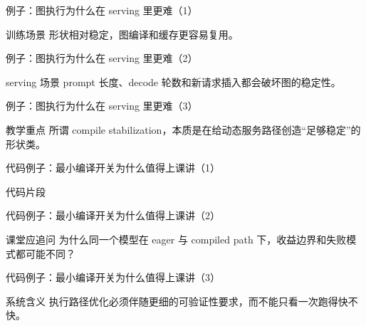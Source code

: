 \begin{frame}{例子：图执行为什么在 serving 里更难（1）}
\begin{block}{训练场景}
    形状相对稳定，图编译和缓存更容易复用。
  \end{block}
\end{frame}

\begin{frame}{例子：图执行为什么在 serving 里更难（2）}
\begin{block}{serving 场景}
    prompt 长度、decode 轮数和新请求插入都会破坏图的稳定性。
  \end{block}
\end{frame}

\begin{frame}{例子：图执行为什么在 serving 里更难（3）}
\begin{block}{教学重点}
    所谓 compile stabilization，本质是在给动态服务路径创造“足够稳定”的形状类。
  \end{block}
\end{frame}

\begin{frame}{代码例子：最小编译开关为什么值得上课讲（1）}
\begin{block}{代码片段}
    {\ttfamily\small
    \par
    \par
    }
  \end{block}
\end{frame}

\begin{frame}{代码例子：最小编译开关为什么值得上课讲（2）}
\begin{block}{课堂应追问}
    为什么同一个模型在 eager 与 compiled path 下，收益边界和失败模式都可能不同？
  \end{block}
\end{frame}

\begin{frame}{代码例子：最小编译开关为什么值得上课讲（3）}
\begin{block}{系统含义}
    执行路径优化必须伴随更细的可验证性要求，而不能只看一次跑得快不快。
  \end{block}
\end{frame}

